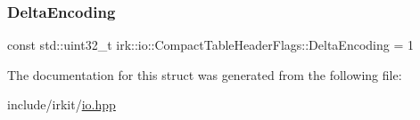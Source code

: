 \subsubsection{\texorpdfstring{Delta\+Encoding}{DeltaEncoding}}
{\footnotesize\ttfamily const std\+::uint32\+\_\+t irk\+::io\+::\+Compact\+Table\+Header\+Flags\+::\+Delta\+Encoding = 1\hspace{0.3cm}{\ttfamily [static]}}



The documentation for this struct was generated from the following file\+:\begin{DoxyCompactItemize}
\item 
include/irkit/\mbox{\hyperlink{io_8hpp}{io.\+hpp}}\end{DoxyCompactItemize}
